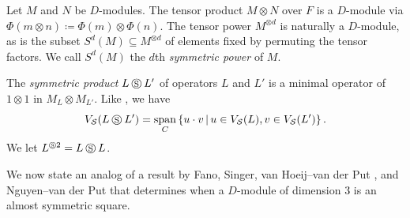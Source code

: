 \documentclass[11pt,reqno]{amsart}
\theoremstyle{definition}
\DeclareMathOperator{\spann}{span}
\newcommand{\cs}{\mathbin{\circledS}}
\begin{document}
Let $M$ and $N$ be $D$-modules. The tensor product $M\otimes N$ over $F$ is a $D$-module via $\Phi (m\otimes n)\coloneqq \Phi (m)\otimes \Phi (n)$. The tensor power $M^{\otimes d}$ is naturally a $D$-module, as is the subset $S^{d}(M)\subseteq M^{\otimes d}$ of elements fixed by permuting the tensor factors.
We call $S^{d}(M)$ the $d$th \emph{symmetric power} of $M$. 

The \emph{symmetric product} $L\cs L'$ of operators $L$ and $L'$ is a minimal operator of $1\otimes 1$ in $M_{L}\otimes M_{L'}$. Like \cite[Corollary 2.19]{put2006galois}, we have
\begin{equation}\label{eq:sym-prod}
V_{\mathcal{S}}(L\cs L')=\spann_{C}\left\lbrace u\cdot v\,\middle\vert\, u\in V_{\mathcal{S}}(L), v\in V_{\mathcal{S}}(L')\right\rbrace.
\end{equation}
We let $L^{\cs 2}= L\cs L$.

We now state an analog of a result by Fano, Singer, van Hoeij--van der Put \cite[Proposition 3.1]{hoeij2006descent}, and Nguyen--van der Put \cite[Corollary 2.2]{nguyen2010solving} that determines when a $D$-module of dimension $3$ is an almost symmetric square.
\end{document}
